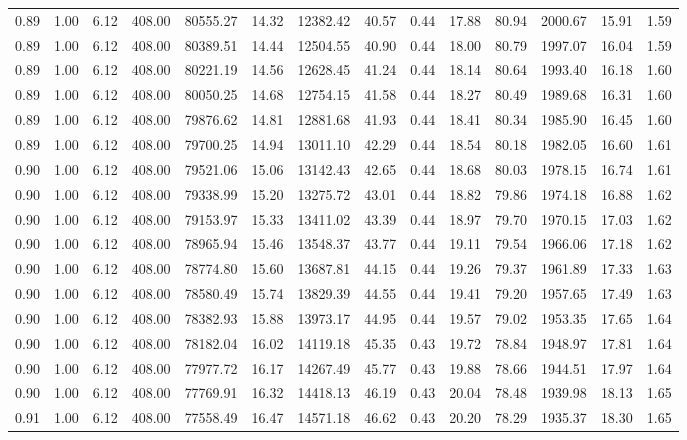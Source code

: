 \begin{table}[!ht]
\begin{tabular}{rrrrrrrrrrrrrr}
0.89 & 1.00 & 6.12 & 408.00 & 80555.27 & 14.32 & 12382.42 & 40.57 & 0.44 & 17.88 & 80.94 & 2000.67 & 15.91 & 1.59 \\
0.89 & 1.00 & 6.12 & 408.00 & 80389.51 & 14.44 & 12504.55 & 40.90 & 0.44 & 18.00 & 80.79 & 1997.07 & 16.04 & 1.59 \\
0.89 & 1.00 & 6.12 & 408.00 & 80221.19 & 14.56 & 12628.45 & 41.24 & 0.44 & 18.14 & 80.64 & 1993.40 & 16.18 & 1.60 \\
0.89 & 1.00 & 6.12 & 408.00 & 80050.25 & 14.68 & 12754.15 & 41.58 & 0.44 & 18.27 & 80.49 & 1989.68 & 16.31 & 1.60 \\
0.89 & 1.00 & 6.12 & 408.00 & 79876.62 & 14.81 & 12881.68 & 41.93 & 0.44 & 18.41 & 80.34 & 1985.90 & 16.45 & 1.60 \\
0.89 & 1.00 & 6.12 & 408.00 & 79700.25 & 14.94 & 13011.10 & 42.29 & 0.44 & 18.54 & 80.18 & 1982.05 & 16.60 & 1.61 \\
0.90 & 1.00 & 6.12 & 408.00 & 79521.06 & 15.06 & 13142.43 & 42.65 & 0.44 & 18.68 & 80.03 & 1978.15 & 16.74 & 1.61 \\
0.90 & 1.00 & 6.12 & 408.00 & 79338.99 & 15.20 & 13275.72 & 43.01 & 0.44 & 18.82 & 79.86 & 1974.18 & 16.88 & 1.62 \\
0.90 & 1.00 & 6.12 & 408.00 & 79153.97 & 15.33 & 13411.02 & 43.39 & 0.44 & 18.97 & 79.70 & 1970.15 & 17.03 & 1.62 \\
0.90 & 1.00 & 6.12 & 408.00 & 78965.94 & 15.46 & 13548.37 & 43.77 & 0.44 & 19.11 & 79.54 & 1966.06 & 17.18 & 1.62 \\
0.90 & 1.00 & 6.12 & 408.00 & 78774.80 & 15.60 & 13687.81 & 44.15 & 0.44 & 19.26 & 79.37 & 1961.89 & 17.33 & 1.63 \\
0.90 & 1.00 & 6.12 & 408.00 & 78580.49 & 15.74 & 13829.39 & 44.55 & 0.44 & 19.41 & 79.20 & 1957.65 & 17.49 & 1.63 \\
0.90 & 1.00 & 6.12 & 408.00 & 78382.93 & 15.88 & 13973.17 & 44.95 & 0.44 & 19.57 & 79.02 & 1953.35 & 17.65 & 1.64 \\
0.90 & 1.00 & 6.12 & 408.00 & 78182.04 & 16.02 & 14119.18 & 45.35 & 0.43 & 19.72 & 78.84 & 1948.97 & 17.81 & 1.64 \\
0.90 & 1.00 & 6.12 & 408.00 & 77977.72 & 16.17 & 14267.49 & 45.77 & 0.43 & 19.88 & 78.66 & 1944.51 & 17.97 & 1.64 \\
0.90 & 1.00 & 6.12 & 408.00 & 77769.91 & 16.32 & 14418.13 & 46.19 & 0.43 & 20.04 & 78.48 & 1939.98 & 18.13 & 1.65 \\
0.91 & 1.00 & 6.12 & 408.00 & 77558.49 & 16.47 & 14571.18 & 46.62 & 0.43 & 20.20 & 78.29 & 1935.37 & 18.30 & 1.65 \\

\end{tabular}
\end{table}
